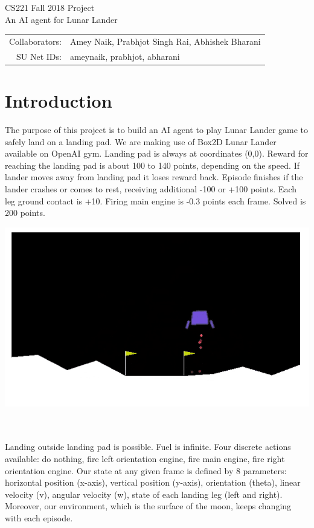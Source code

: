\documentclass[12pt]{article}
\begin{document}
\begin{center}
{\Large CS221 Fall 2018 Project} \\
{\Large An AI agent for Lunar Lander}

\begin{tabular}{rl}
Collaborators: & Amey Naik, Prabhjot Singh Rai, Abhishek Bharani \\
SU Net IDs: & ameynaik, prabhjot, abharani
\end{tabular}
\end{center}


\section{Introduction}

\noindent\begin{minipage}{0.6\textwidth}
The purpose of this project is to build an AI agent to play Lunar Lander game to safely land on a landing pad. We are making use of Box2D Lunar Lander available on OpenAI gym\citep{openai}. Landing pad is always at coordinates (0,0). Reward for reaching the landing pad is about 100 to 140 points, depending on the speed. If lander moves away from landing pad it loses reward back. Episode finishes if the lander crashes or comes to rest, receiving additional -100 or +100 points. Each leg ground contact is +10. Firing main engine is -0.3 points each frame. Solved is 200 points.
\end{minipage}
\begin{minipage}{0.3\textwidth}\raggedleft
{}
\includegraphics[scale=0.3]{LunarLanderDemoImage.png}
\end{minipage}
\\ \\
Landing outside landing pad is possible. Fuel is infinite. Four discrete actions available: do nothing, fire left orientation engine, fire main engine, fire right orientation engine. Our state at any given frame is defined by 8 parameters: horizontal position (x-axis), vertical position (y-axis), orientation (theta), linear velocity (v), angular velocity (w), state of each landing leg (left and right). Moreover, our environment, which is the surface of the moon, keeps changing with each episode.
\end{document}
